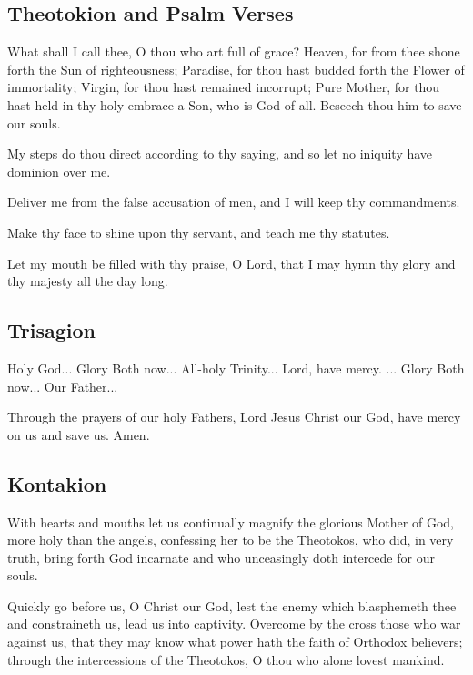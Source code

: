 \subsection{Theotokion and Psalm Verses}

What shall I call thee, O thou who art full of grace? Heaven, for from thee shone forth the Sun of righteousness; Paradise, for thou hast budded forth the Flower of immortality; Virgin, for thou hast remained incorrupt; Pure Mother, for thou hast held in thy holy embrace a Son, who is God of all. Beseech thou him to save our souls.

My steps do thou direct according to thy saying, and so let no iniquity have dominion over me. 

Deliver me from the false accusation of men, and I will keep thy commandments. 

Make thy face to shine upon thy servant, and teach me thy statutes. 

Let my mouth be filled with thy praise, O Lord, that I may hymn thy glory and thy majesty all the day long. 

\subsection{Trisagion}

Holy God... Glory  Both now... All-holy Trinity... Lord, have mercy. ... Glory  Both now... Our Father...

Through the prayers of our holy Fathers, Lord Jesus Christ our God, have mercy on us and save us. Amen.

\subsection{Kontakion}


 With hearts and mouths let us continually magnify the glorious Mother of God, more holy than the angels, confessing her to be the Theotokos, who did, in very truth, bring forth God incarnate and who unceasingly doth intercede for our souls.

 Quickly go before us, O Christ our God, lest the enemy which blasphemeth thee and constraineth us, lead us into captivity. Overcome by the cross those who war against us, that they may know what power hath the faith of Orthodox believers; through the intercessions of the Theotokos, O thou who alone lovest mankind.

